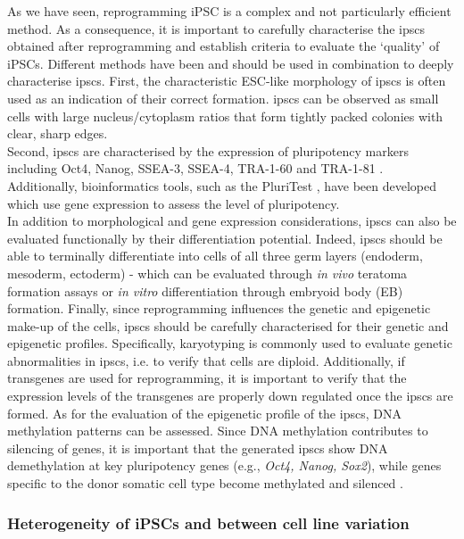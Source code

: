 As we have seen, reprogramming iPSC is a complex and not particularly efficient method.
As a consequence, it is important to carefully characterise the \glspl{ipsc} obtained after reprogramming \cite{brouwer2016choices} and establish criteria to evaluate the `quality' of iPSCs.
Different methods have been and should be used in combination to deeply characterise \glspl{ipsc}. 
First, the characteristic ESC-like morphology of \glspl{ipsc} is often used as an indication of their correct formation. 
\glspl{ipsc} can be observed as small cells with large nucleus/cytoplasm ratios that form tightly packed colonies with clear, sharp edges. \\

Second, \glspl{ipsc} are characterised by the expression of pluripotency markers including Oct4, Nanog, SSEA-3, SSEA-4, TRA-1-60 and TRA-1-81 \cite{boulting2011functionally}.
Additionally, bioinformatics tools, such as the PluriTest \cite{muller2011bioinformatic}, have been developed which use gene expression to assess the level of pluripotency. \\

In addition to morphological and gene expression considerations, \glspl{ipsc} can also be evaluated functionally by their differentiation potential.
Indeed, \glspl{ipsc} should be able to terminally differentiate into cells of all three germ layers (endoderm, mesoderm, ectoderm) - which can be evaluated through \textit{in vivo} teratoma formation assays or \textit{in vitro} differentiation through embryoid body (EB) formation.
Finally, since reprogramming influences the genetic and epigenetic make-up of the cells, \glspl{ipsc} should be carefully characterised for their genetic and epigenetic profiles.
Specifically, karyotyping is commonly used to evaluate genetic abnormalities in \glspl{ipsc}, i.e. to verify that cells are diploid. 
Additionally, if transgenes are used for reprogramming, it is important to verify that the expression levels of the transgenes are properly down regulated once the \glspl{ipsc} are formed. 
As for the evaluation of the epigenetic profile of the \glspl{ipsc}, DNA methylation patterns can be assessed. 
Since DNA methylation contributes to silencing of genes, it is important that the generated \glspl{ipsc} show DNA demethylation at key pluripotency genes (e.g., \textit{Oct4, Nanog, Sox2}), while genes specific to the donor somatic cell type become methylated and silenced \cite{brouwer2016choices, omole2018ten}. 

\subsubsection{Heterogeneity of iPSCs and between cell line variation}

